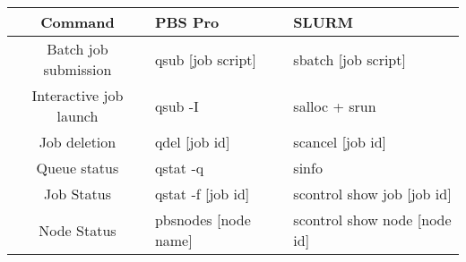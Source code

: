 \small
\begin{tabularx}{\textwidth}{c|X|X}
\toprule
{\bf Command} & {\bf PBS Pro} & {\bf SLURM}  \\
\midrule

Batch job submission &
qsub [job script] &
sbatch [job script]
\\ \hline

Interactive job launch &
qsub -I &
salloc + srun
\\ \hline

Job deletion &
qdel [job id] &
scancel [job id]
\\ \hline

Queue status &
qstat -q &
sinfo
\\ \hline

Job Status &
qstat -f [job id] &
scontrol show job [job id]
\\ \hline

Node Status &
pbsnodes [node name] &
scontrol show node [node id]
\\ \hline

\bottomrule
\end{tabularx}




